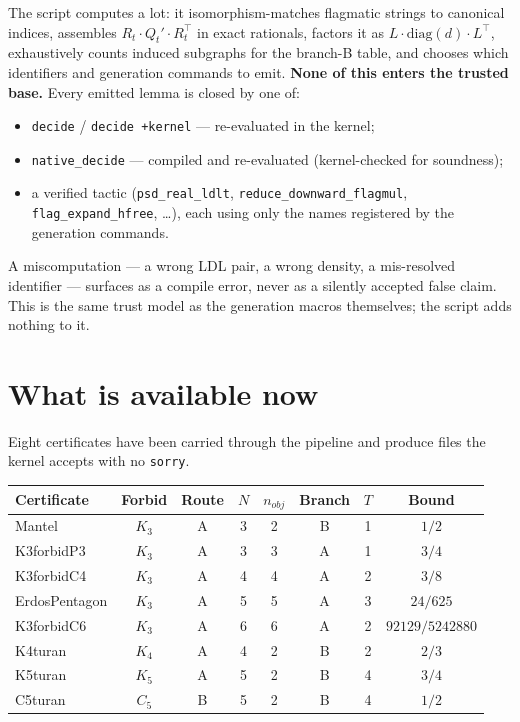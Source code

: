 \documentclass[11pt]{article}
\begin{document}
The script computes a lot: it isomorphism-matches flagmatic strings to canonical
indices, assembles $R_t\cdot Q_t'\cdot R_t^\top$ in exact rationals, factors it
as $L\cdot\mathrm{diag}(d)\cdot L^\top$, exhaustively counts induced subgraphs for
the branch-B table, and chooses which identifiers and generation commands to
emit. \textbf{None of this enters the trusted base.} Every emitted lemma is closed
by one of:
\begin{itemize}
  \item \texttt{decide} / \texttt{decide +kernel} --- re-evaluated in the kernel;
  \item \texttt{native\_decide} --- compiled and re-evaluated (kernel-checked for
    soundness);
  \item a verified tactic (\texttt{psd\_real\_ldlt},
    \texttt{reduce\_downward\_flagmul}, \texttt{flag\_expand\_hfree}, \ldots),
    each using only the names registered by the generation commands.
\end{itemize}
A miscomputation --- a wrong LDL pair, a wrong density, a mis-resolved identifier
--- surfaces as a compile error, never as a silently accepted false claim. This
is the same trust model as the generation macros themselves; the script adds
nothing to it.

\section{What is available now}
\label{sec:scenarios}

Eight certificates have been carried through the pipeline and produce files the
kernel accepts with no \texttt{sorry}.

\begin{center}
\begin{tabular}{lccccccc}
\toprule
Certificate & Forbid & Route & $N$ & $n_{\mathit{obj}}$ & Branch & $T$ & Bound \\
\midrule
Mantel        & $K_3$ & A & 3 & 2 & B & 1 & $1/2$    \\
K3forbidP3    & $K_3$ & A & 3 & 3 & A & 1 & $3/4$    \\
K3forbidC4    & $K_3$ & A & 4 & 4 & A & 2 & $3/8$    \\
ErdosPentagon & $K_3$ & A & 5 & 5 & A & 3 & $24/625$ \\
K3forbidC6    & $K_3$ & A & 6 & 6 & A & 2 & $92129/5242880$ \\
K4turan       & $K_4$ & A & 4 & 2 & B & 2 & $2/3$    \\
K5turan       & $K_5$ & A & 5 & 2 & B & 4 & $3/4$    \\
C5turan       & $C_5$ & B & 5 & 2 & B & 4 & $1/2$    \\
\bottomrule
\end{tabular}
\end{center}
\end{document}
